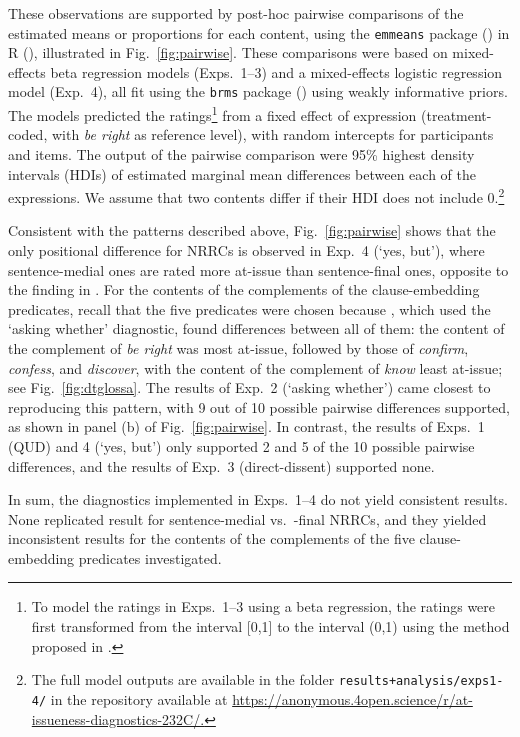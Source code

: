 \documentclass[times,linguex]{glossa}
\begin{document}
These observations are supported by post-hoc pairwise comparisons of the estimated means or proportions for each content, using the \texttt{emmeans} package (\citealt{emmeans}) in R (\citealt{r}), illustrated in Fig.~\ref{fig:pairwise}. These comparisons were based on mixed-effects beta regression models (Exps.~1--3) and a mixed-effects logistic regression model (Exp.~4), all fit using the \texttt{brms} package (\citealt{buerkner2017}) using weakly informative priors. The models predicted the ratings\footnote{To model the ratings in Exps.~1--3 using a beta regression, the ratings were first transformed from the interval [0,1] to the interval (0,1) using the method proposed in \citealt{smithson-verkuilen2006}.} from a fixed effect of expression (treatment-coded, with \emph{be right} as reference level), with random intercepts for participants and items. The output of the pairwise comparison were 95\% highest density intervals (HDIs) of estimated marginal mean differences between each of the expressions. We assume that two contents differ if their HDI does not include 0.\footnote{The full model outputs are available in the folder \texttt{results+analysis/exps1-4/} in the repository available at \url{https://anonymous.4open.science/r/at-issueness-diagnostics-232C/.}}

Consistent with the patterns described above, Fig.~\ref{fig:pairwise} shows that the only positional difference for NRRCs is observed in Exp.~4 (`yes, but'), where sentence-medial ones are rated more at-issue than sentence-final ones, opposite to the finding in \citet{syrett_experimental_2015}. For the contents of the complements of the clause-embedding predicates, recall that the five predicates were chosen because \citealt[Exp.~1]{degen_projection_2025}, which used the `asking whether' diagnostic, found differences between all of them: the content of the complement of \emph{be right} was most at-issue, followed by those of \emph{confirm}, \emph{confess}, and \emph{discover}, with the content of the complement of \emph{know} least at-issue; see Fig.~\ref{fig:dtglossa}. The results of Exp.~2 (`asking whether') came closest to reproducing this pattern, with 9 out of 10 possible pairwise differences supported, as shown in panel (b) of Fig.~\ref{fig:pairwise}. In contrast, the results of Exps.~1 (QUD)  and 4 (`yes, but') only supported 2 and 5 of the 10 possible pairwise differences, and the results of Exp.~3 (direct-dissent) supported none. 

In sum, the diagnostics implemented in Exps.~1--4 do not yield consistent results. None replicated  result for sentence-medial vs.~-final NRRCs, and they yielded inconsistent results for the  contents of the complements of the five clause-embedding predicates investigated.
\end{document}
